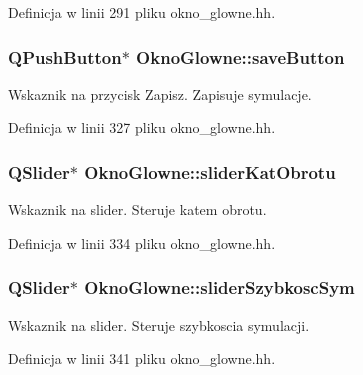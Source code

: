 Definicja w linii 291 pliku okno\+\_\+glowne.\+hh.

\hypertarget{class_okno_glowne_a81e6650fa592f04bf0adc3bebd3346d6}{}
\subsubsection[{save\+Button}]{\setlength{\rightskip}{0pt plus 5cm}Q\+Push\+Button$\ast$ Okno\+Glowne\+::save\+Button\hspace{0.3cm}{\ttfamily [private]}}\label{class_okno_glowne_a81e6650fa592f04bf0adc3bebd3346d6}
Wskaznik na przycisk Zapisz. Zapisuje symulacje. 

Definicja w linii 327 pliku okno\+\_\+glowne.\+hh.

\hypertarget{class_okno_glowne_aaee43ea7074cff126b069c60657d698d}{}
\subsubsection[{slider\+Kat\+Obrotu}]{\setlength{\rightskip}{0pt plus 5cm}Q\+Slider$\ast$ Okno\+Glowne\+::slider\+Kat\+Obrotu\hspace{0.3cm}{\ttfamily [private]}}\label{class_okno_glowne_aaee43ea7074cff126b069c60657d698d}
Wskaznik na slider. Steruje katem obrotu. 

Definicja w linii 334 pliku okno\+\_\+glowne.\+hh.

\hypertarget{class_okno_glowne_a85328893065393400d5a0344004ca78b}{}
\subsubsection[{slider\+Szybkosc\+Sym}]{\setlength{\rightskip}{0pt plus 5cm}Q\+Slider$\ast$ Okno\+Glowne\+::slider\+Szybkosc\+Sym\hspace{0.3cm}{\ttfamily [private]}}\label{class_okno_glowne_a85328893065393400d5a0344004ca78b}
Wskaznik na slider. Steruje szybkoscia symulacji. 

Definicja w linii 341 pliku okno\+\_\+glowne.\+hh.

\hypertarget{class_okno_glowne_a40a10989bc6b318ac24e2457d7adb53b}{}
